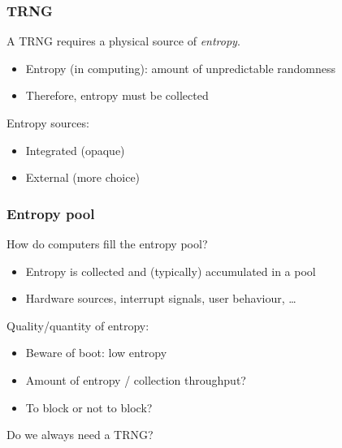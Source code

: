 \begin{frame}
  \frametitle{TRNG}

  \pause
  A TRNG requires a physical source of \emph{entropy}.
  \begin{itemize}[<+(1)->]
    \item Entropy (in computing): amount of unpredictable randomness
    \item Therefore, entropy must be collected
  \end{itemize}

  \vspace*{1em}

  \pause
  Entropy sources:
  \begin{itemize}[<+(1)->]
    \item Integrated (opaque)
    \item External (more choice)
  \end{itemize}
\end{frame}

\begin{frame}
  \frametitle{Entropy pool}

  \pause
  How do computers fill the entropy pool?
  \begin{itemize}[<+(1)->]
    \item Entropy is collected and (typically) accumulated in a pool
    \item Hardware sources, interrupt signals, user behaviour, \dots
  \end{itemize}

  \vspace*{1em}

  \pause
  Quality/quantity of entropy:
  \begin{itemize}[<+(1)->]
    \item Beware of boot: low entropy
    \item Amount of entropy / collection throughput?
    \item To block or not to block?
  \end{itemize}

  \vspace*{1em}

  \pause
  Do we always need a TRNG?
\end{frame}


